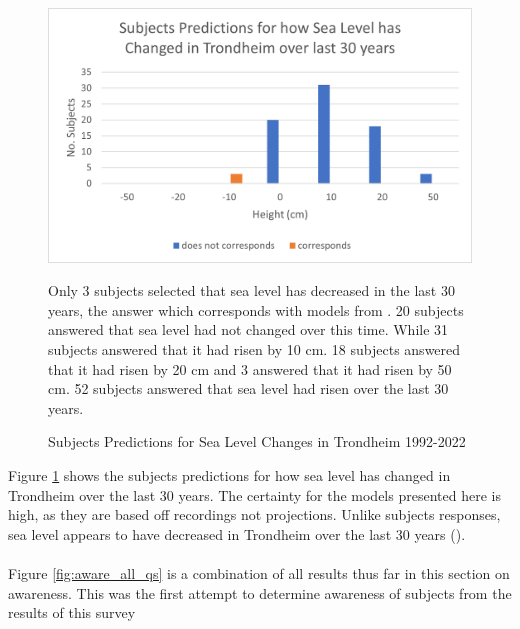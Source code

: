\begin{figure}[H]
    \centering
    \includegraphics{fig_results/slr-past.png}
    \caption{Subjects Predictions for Sea Level Changes in Trondheim 1992-2022}{ Only 3 subjects selected that sea level has decreased in the last 30 years, the answer which corresponds with models from \cite{kartverket_se_2021}. 20 subjects answered that sea level had not changed over this time. While 31 subjects answered that it had risen by 10 cm. 18 subjects answered that it had risen by 20 cm and 3 answered that it had risen by 50 cm. 52 subjects answered that sea level had risen over the last 30 years. }
    \label{fig:slr_past}
\end{figure}

Figure \ref{fig:slr_past} shows the subjects predictions for how sea level has changed in Trondheim over the last 30 years. The certainty for the models presented here is high, as they are based off recordings not projections. Unlike subjects responses, sea level appears to have decreased in Trondheim over the last 30 years (\cite{tides_high_2022}).
\paragraph{}

Figure \ref{fig:aware_all_qs} is a combination of all results thus far in this section on awareness. This was the first attempt to determine awareness of subjects from the results of this survey

